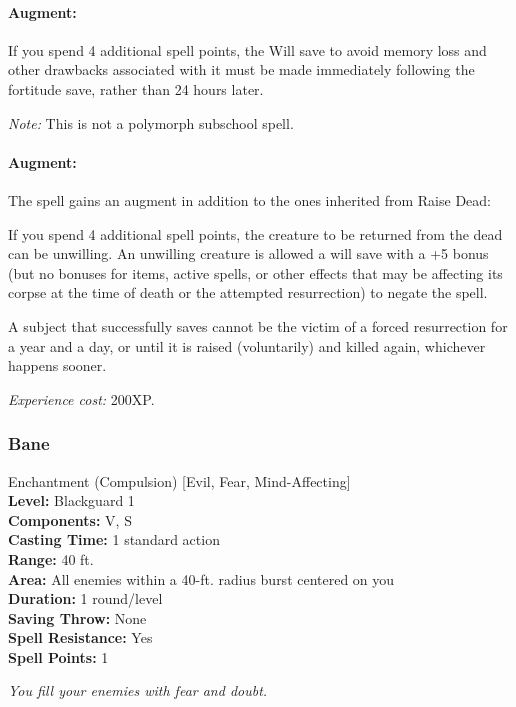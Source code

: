 \paragraph{Augment:} If you spend 4 additional spell points, the Will save to avoid memory loss and other drawbacks associated with it must be made immediately following the fortitude save, 
rather than 24 hours later.

\emph{Note:} This is not a polymorph subschool spell.


\paragraph{Augment:} The spell gains an augment in addition to the ones inherited from Raise Dead:
\begin{list}{}{\leftmargin=1em}
 \item If you spend 4 additional spell points, the creature to be returned from the dead can be unwilling.
An unwilling creature is allowed a will save with a +5 bonus 
(but no bonuses for items, active spells, or other effects 
that may be affecting its corpse at the time of death or the attempted resurrection)
to negate the spell.

A subject that successfully saves cannot be the victim of a forced resurrection for a year and a day, 
or until it is raised (voluntarily) and killed again, whichever happens sooner.
\end{list}

\emph{Experience cost:} 200XP.
\subsubsection{Bane}
\label{Spell:Bane}
Enchantment (Compulsion) [Evil, Fear, Mind-Affecting]
\\ \textbf{Level:} Blackguard 1
\\ \textbf{Components:} V, S
\\ \textbf{Casting Time:} 1 standard action
\\ \textbf{Range:} 40 ft.
\\ \textbf{Area:} All enemies within a 40-ft. radius burst centered on you
\\ \textbf{Duration:} 1 round/level
\\ \textbf{Saving Throw:} None
\\ \textbf{Spell Resistance:} Yes
\\ \textbf{Spell Points:} 1

\emph{You fill your enemies with fear and doubt.}


